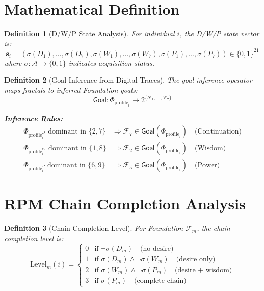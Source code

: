 \documentclass[11pt,twoside]{book}
\newcommand{\Foundations}{\mathcal{F}}
\newcommand{\Acquisitions}{\mathcal{A}}
\newcommand{\ProfileFrac}{\Phi_{\mathrm{profile}}}
\newtheorem{definition}{Definition}[chapter]
\begin{document}
\section{Mathematical Definition}

\begin{definition}[D/W/P State Analysis]
\label{def:dwp-state}
For individual $i$, the \emph{D/W/P state vector} is:
\[
    \mathbf{s}_i = \left( \sigma(D_1), \ldots, \sigma(D_7), \sigma(W_1), \ldots, \sigma(W_7), \sigma(P_1), \ldots, \sigma(P_7) \right) \in \{0, 1\}^{21}
\]
where $\sigma : \Acquisitions \to \{0, 1\}$ indicates acquisition status.
\end{definition}

\begin{definition}[Goal Inference from Digital Traces]
\label{def:goal-inference}
The \emph{goal inference operator} maps fractals to inferred Foundation goals:
\[
    \mathsf{Goal} : \ProfileFrac_i \longrightarrow 2^{\{\Foundations_1, \ldots, \Foundations_7\}}
\]

\textbf{Inference Rules:}
\begin{align}
    \ProfileFrac_i^D \text{ dominant in } \{2, 7\} &\Rightarrow \Foundations_7 \in \mathsf{Goal}(\ProfileFrac_i) \quad \text{(Continuation)} \\
    \ProfileFrac_i^W \text{ dominant in } \{1, 8\} &\Rightarrow \Foundations_2 \in \mathsf{Goal}(\ProfileFrac_i) \quad \text{(Wisdom)} \\
    \ProfileFrac_i^P \text{ dominant in } \{6, 9\} &\Rightarrow \Foundations_5 \in \mathsf{Goal}(\ProfileFrac_i) \quad \text{(Power)}
\end{align}
\end{definition}

\section{RPM Chain Completion Analysis}

\begin{definition}[Chain Completion Level]
\label{def:chain-level}
For Foundation $\Foundations_m$, the \emph{chain completion level} is:
\[
    \mathrm{Level}_m(i) =
    \begin{cases}
        0 & \text{if } \neg\sigma(D_m) \quad \text{(no desire)} \\
        1 & \text{if } \sigma(D_m) \land \neg\sigma(W_m) \quad \text{(desire only)} \\
        2 & \text{if } \sigma(W_m) \land \neg\sigma(P_m) \quad \text{(desire + wisdom)} \\
        3 & \text{if } \sigma(P_m) \quad \text{(complete chain)}
    \end{cases}
\]
\end{definition}
\end{document}
